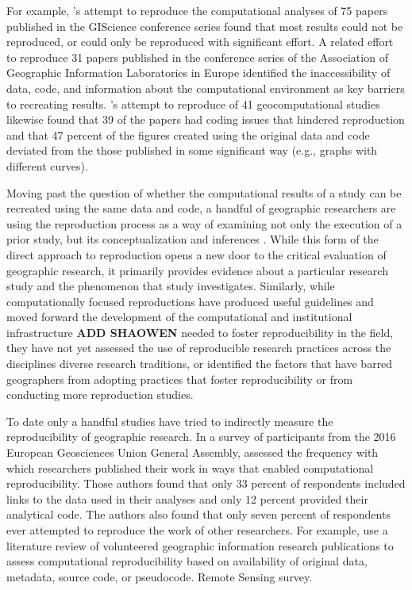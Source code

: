 \documentclass[]{interact}
\theoremstyle{plain}%
\theoremstyle{definition}
\theoremstyle{remark}
\begin{document}
For example, \citet{ostermann2021}'s attempt to reproduce the computational analyses of 75 papers published in the GIScience conference series found that most results could not be reproduced, or could only be reproduced with significant effort. 
A related effort to reproduce 31 papers published in the conference series of the Association of Geographic Information Laboratories in Europe \citep{Nust_AGILE_2020, Nust2021AGILE, Nust_AGILE_2022} identified the inaccessibility of data, code, and information about the computational environment as key barriers to recreating results. 
\citet{konkol2019}'s attempt to reproduce of 41 geocomputational studies likewise found that 39 of the papers had coding issues that hindered reproduction and that 47 percent of the figures created using the original data and code deviated from the those published in some significant way (e.g., graphs with different curves). 

Moving past the question of whether the computational results of a study can be recreated using the same data and code, a handful of geographic researchers are using the reproduction process as a way of examining not only the execution of a prior study, but its conceptualization and inferences \citep{Kedron_MollaloRP, Kedron_SaffaryRP, Kedron_VijayanRP}. 
While this form of the direct approach to reproduction opens a new door to the critical evaluation of geographic research, it primarily provides evidence about a particular research study and the phenomenon that study investigates. 
Similarly, while computationally focused reproductions have produced useful guidelines \citep{hofer2019reproducible, wilson2021} and moved forward the development of the computational and institutional infrastructure \citep{Kedron_Holler_Bardin_Hilgendorf_2022, nust2019, nust2021,}\textbf{ADD SHAOWEN} needed to foster reproducibility in the field, they have not yet assessed the use of reproducible research practices across the disciplines diverse research traditions, or identified the factors that have barred geographers from adopting practices that foster reproducibility or from conducting more reproduction studies. 


To date only a handful studies have tried to indirectly measure the reproducibility of geographic research.
In a survey of participants from the 2016 European Geosciences Union General Assembly, \citet{konkol2019} assessed the frequency with which researchers published their work in ways that enabled computational reproducibility. 
Those authors found that only 33 percent of respondents included links to the data used in their analyses and only 12 percent provided their analytical code. 
The authors also found that only seven percent of respondents ever attempted to reproduce the work of other researchers.
For example, \citet{ostermann2017} use a literature review of volunteered geographic information research publications to assess computational reproducibility based on availability of original data, metadata, source code, or pseudocode.
Remote Sensing survey.
\end{document}
